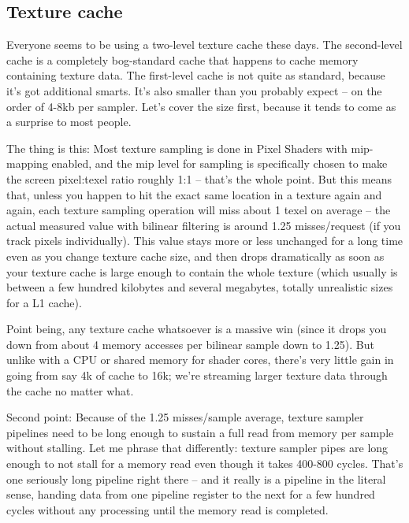\documentclass[12pt]{article}
\begin{document}
\subsection{Texture cache}
\label{sec:org55f5310}

Everyone seems to be using a two-level texture cache these days. The second-level cache is a completely bog-standard cache that happens to cache memory containing texture data. The first-level cache is not quite as standard, because it’s got additional smarts. It’s also smaller than you probably expect – on the order of 4-8kb per sampler. Let’s cover the size first, because it tends to come as a surprise to most people.

The thing is this: Most texture sampling is done in Pixel Shaders with mip-mapping enabled, and the mip level for sampling is specifically chosen to make the screen pixel:texel ratio roughly 1:1 – that’s the whole point. But this means that, unless you happen to hit the exact same location in a texture again and again, each texture sampling operation will miss about 1 texel on average – the actual measured value with bilinear filtering is around 1.25 misses/request (if you track pixels individually). This value stays more or less unchanged for a long time even as you change texture cache size, and then drops dramatically as soon as your texture cache is large enough to contain the whole texture (which usually is between a few hundred kilobytes and several megabytes, totally unrealistic sizes for a L1 cache).

Point being, any texture cache whatsoever is a massive win (since it drops you down from about 4 memory accesses per bilinear sample down to 1.25). But unlike with a CPU or shared memory for shader cores, there’s very little gain in going from say 4k of cache to 16k; we’re streaming larger texture data through the cache no matter what.

Second point: Because of the 1.25 misses/sample average, texture sampler pipelines need to be long enough to sustain a full read from memory per sample without stalling. Let me phrase that differently: texture sampler pipes are long enough to not stall for a memory read even though it takes 400-800 cycles. That’s one seriously long pipeline right there – and it really is a pipeline in the literal sense, handing data from one pipeline register to the next for a few hundred cycles without any processing until the memory read is completed.
\end{document}
